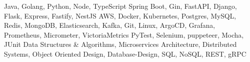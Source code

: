 




\addvspace{-1.5ex}
\begin{cvskills}
    {Java, Golang, Python, Node, TypeScript}
    {Spring Boot, Gin, FastAPI, Django, Flask, Express, Fastify, NestJS}
    {AWS, Docker, Kubernetes, Postgres, MySQL, Redis, MongoDB, Elasticsearch, Kafka, Git, Linux, ArgoCD, Grafana,
    Prometheus, Micrometer, VictoriaMetrics}
    {PyTest, Selenium, puppeteer, Mocha, JUnit}
    {Data Structures \& Algorithms, Microservices Architecture, Distributed Systems, Object Oriented Design, 
    Database-Design, SQL, NoSQL, REST, gRPC}
\end{cvskills}
\addvspace{1.5ex}